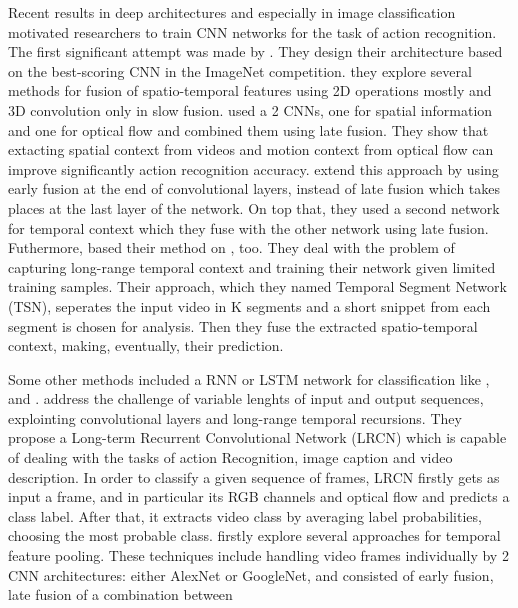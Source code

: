 Recent results in deep architectures and especially in image classification motivated researchers to train CNN networks for
the task of action recognition. The first significant attempt was made by \cite{6909619}. They design their architecture based on the best-scoring CNN
in the ImageNet competition. they explore several methods for fusion of spatio-temporal features using 2D operations mostly and 3D convolution only in slow fusion.
\cite{simonyan2014two}  used a 2 CNNs, one for spatial information and one for optical flow and combined them using late fusion.
They show that extacting spatial context from videos and motion context from optical flow can improve significantly action recognition accuracy.
\cite{DBLP:journals/corr/FeichtenhoferPZ16} extend this approach by using early fusion at the end of convolutional layers,  instead of late fusion which
takes places at the last layer of the network. On top that, they used a second network for temporal context which they fuse with the other network using late
fusion. Futhermore, \cite{DBLP:journals/corr/WangXW0LTG16} based their method on \cite{simonyan2014two}, too. They deal with the problem of capturing long-range
temporal context and training their network given limited training samples. Their approach, which they named Temporal Segment Network (TSN), seperates the input
video in K segments and a short snippet from each segment is chosen for analysis. Then they fuse  the extracted spatio-temporal context, making, eventually, their
prediction. \par
Some other methods included a RNN or LSTM network for classification like \cite{DBLP:journals/corr/DonahueHGRVSD14}, \cite{DBLP:journals/corr/NgHVVMT15} and \cite{DBLP:journals/corr/MaCKA17}.  \cite{DBLP:journals/corr/DonahueHGRVSD14} address the challenge of variable lenghts of
input and output sequences, explointing convolutional layers and long-range temporal recursions. They propose a Long-term Recurrent
Convolutional Network (LRCN) which is capable of dealing with the tasks of action Recognition, image caption and video description. In order to classify a given sequence of frames, LRCN firstly gets as input a frame, and in particular its RGB channels and optical flow and predicts a class label. After that, it extracts video class by averaging label probabilities, choosing the most probable class.
\cite{DBLP:journals/corr/NgHVVMT15} firstly explore several approaches for temporal feature pooling. These techniques include handling video
frames individually by 2 CNN architectures: either AlexNet or GoogleNet, and consisted of early fusion, late fusion of a combination between
